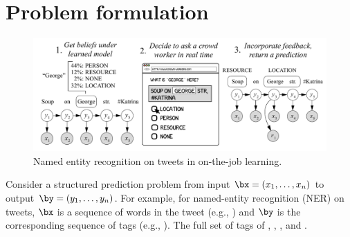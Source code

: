 \section{Problem formulation}
\label{sec:model}

\begin{figure}[t]
  \begin{centering}
  \includegraphics[width=1.0\textwidth]{figures/intro-banner.pdf}
  \end{centering}
  \caption{
    Named entity recognition on tweets in on-the-job learning.
}
\label{fig:crf}
\end{figure}


Consider a structured prediction problem from input $\bx = (x_1, \dots, x_n)$ to output $\by = (y_1, \dots, y_n)$.
For example, for named-entity recognition (NER) on tweets,
$\bx$ is a sequence of words in the tweet (e.g., )
and $\by$ is the corresponding sequence of tags (e.g., \scnone{} \scloc{} \scloc{}).
The full set of tags of \scper{}, \scloc{}, \scres{}, and \scnone{}.

